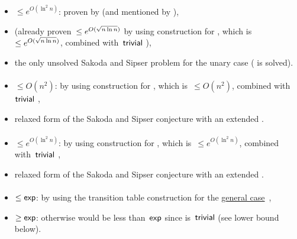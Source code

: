 \paragraph{\TNFA{}\tto\TDFA}\label{cost:2NFAto2DFAu}
\begin{itemize}
	\item $\le e^{O(\ln^2n)}$: proven by  (and mentioned by ),
	\item (already proven~$\le e^{O(\sqrt{n\ln n})}$ by using construction for \hyperref[cost:2NFAto1DFAu]{\TNFA{}\tto\ODFA}, which is~$\le e^{O(\sqrt{n\ln n})}$, combined with~$\mathsf{trivial}$ \ODFA{}\tto\TDFA),
	\item the only unsolved Sakoda and Sipser problem for the unary case (\hyperref[cost:1NFAto2DFAu]{\ONFA{}\tto\TDFA} is solved).
\end{itemize}
\paragraph{\ONFA{}\tto\ODLA}\label{cost:1NFAto1DLAu}
\begin{itemize}
	\item $\le O(n^2)$: by using construction for \hyperref[cost:1NFAto2DFAu]{\ONFA{}\tto\TDFA}, which is~$\le O(n^2)$, combined with~$\mathsf{trivial}$ \TDFA{}\tto\ODLA,
	\item relaxed form of the Sakoda and Sipser conjecture with an extended \TDFA.
\end{itemize}
\paragraph{\TNFA{}\tto\ODLA}
\begin{itemize}
	\item $\le e^{O(\ln^2n)}$: by using construction for \hyperref[cost:2NFAto2DFAu]{\TNFA{}\tto\TDFA}, which is~$\le e^{O(\ln^2n)}$, combined with~$\mathsf{trivial}$ \TDFA{}\tto\ODLA,
	\item relaxed form of the Sakoda and Sipser conjecture with an extended \TDFA.
\end{itemize}
\paragraph{\ODLA{}\tto\ODFA}\label{cost:1DLAto1DFAu}
\begin{itemize}
	\item $\le\mathsf{exp}$: by using the transition table construction for the \hyperref[cost:1DLAto1DFA]{general case}~\cite{PigPis14},
	\item $\ge\mathsf{exp}$: otherwise \hyperref[cost:1DLAto2NFAu]{\ODLA{}\tto\TNFA} would be less than~$\mathsf{exp}$ since \ODFA{}\tto\TNFA is~$\mathsf{trivial}$ (see lower bound below).
\end{itemize}
